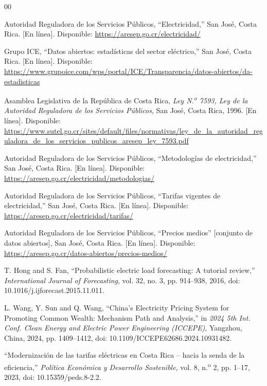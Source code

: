 \documentclass[conference]{IEEEtran}
\begin{document}
\begin{thebibliography}{00}

 Autoridad Reguladora de los Servicios P\'ublicos, ``Electricidad,'' San Jos\'e, Costa Rica. [En l\'inea]. Disponible: \url{https://aresep.go.cr/electricidad/}

 Grupo ICE, ``Datos abiertos: estad\'isticas del sector el\'ectrico,'' San Jos\'e, Costa Rica. [En l\'inea]. Disponible: \url{https://www.grupoice.com/wps/portal/ICE/Transparencia/datos-abiertos/da-estadisticas}

 Asamblea Legislativa de la Rep\'ublica de Costa Rica, \emph{Ley N.\textsuperscript{o} 7593, Ley de la Autoridad Reguladora de los Servicios P\'ublicos}, San Jos\'e, Costa Rica, 1996. [En l\'inea]. Disponible: \url{https://www.sutel.go.cr/sites/default/files/normativas/ley_de_la_autoridad_reguladora_de_los_servicios_publicos_aresep_ley_7593.pdf}

 Autoridad Reguladora de los Servicios P\'ublicos, ``Metodolog\'ias de electricidad,'' San Jos\'e, Costa Rica. [En l\'inea]. Disponible: \url{https://aresep.go.cr/electricidad/metodologias/}

 Autoridad Reguladora de los Servicios P\'ublicos, ``Tarifas vigentes de electricidad,'' San Jos\'e, Costa Rica. [En l\'inea]. Disponible: \url{https://aresep.go.cr/electricidad/tarifas/}

 Autoridad Reguladora de los Servicios P\'ublicos, ``Precios medios'' [conjunto de datos abiertos], San Jos\'e, Costa Rica. [En l\'inea]. Disponible: \url{https://aresep.go.cr/datos-abiertos/precios-medios/}

 T. Hong and S. Fan, ``Probabilistic electric load forecasting: A tutorial review,'' \emph{International Journal of Forecasting}, vol. 32, no. 3, pp. 914--938, 2016, doi: 10.1016/j.ijforecast.2015.11.011.

 L. Wang, Y. Sun and Q. Wang, ``China's Electricity Pricing System for Promoting Common Wealth: Mechanism Path and Analysis,'' in \emph{2024 5th Int. Conf. Clean Energy and Electric Power Engineering (ICCEPE)}, Yangzhou, China, 2024, pp. 1409--1412, doi: 10.1109/ICCEPE62686.2024.10931482.

 ``Modernizaci\'on de las tarifas el\'ectricas en Costa Rica -- hacia la senda de la eficiencia,'' \emph{Pol\'itica Econ\'omica y Desarrollo Sostenible}, vol. 8, n.\textsuperscript{o} 2, pp. 1--17, 2023, doi: 10.15359/peds.8-2.2.


\end{thebibliography}
\end{document}
